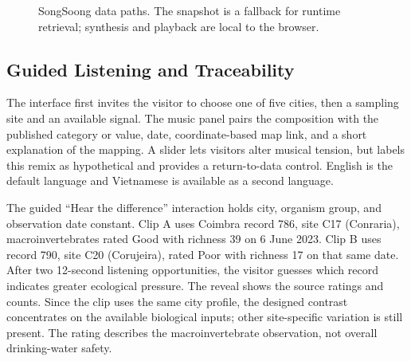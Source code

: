 \documentclass[conference]{IEEEtran}
\begin{document}
\begin{figure}[t]
\centering
\footnotesize
{}
\caption{SongSoong data paths. The snapshot is a fallback for runtime retrieval; synthesis and playback are local to the browser.}
\label{fig:architecture}
\end{figure}

\subsection{Guided Listening and Traceability}
The interface first invites the visitor to choose one of five cities, then a sampling site and an available signal. The music panel pairs the composition with the published category or value, date, coordinate-based map link, and a short explanation of the mapping. A slider lets visitors alter musical tension, but labels this remix as hypothetical and provides a return-to-data control. English is the default language and Vietnamese is available as a second language.

The guided ``Hear the difference'' interaction holds city, organism group, and observation date constant. Clip A uses Coimbra record 786, site C17 (Conraria), macroinvertebrates rated Good with richness 39 on 6 June 2023. Clip B uses record 790, site C20 (Corujeira), rated Poor with richness 17 on that same date. After two 12-second listening opportunities, the visitor guesses which record indicates greater ecological pressure. The reveal shows the source ratings and counts. Since the clip uses the same city profile, the designed contrast concentrates on the available biological inputs; other site-specific variation is still present. The rating describes the macroinvertebrate observation, not overall drinking-water safety.
\end{document}
